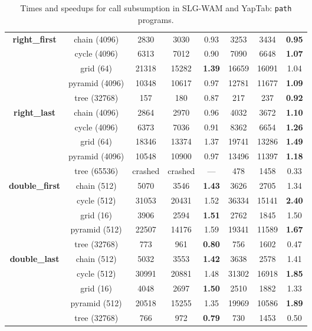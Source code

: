 \begin{table}[ht]
{\begin{tabular}{cc|ccc|ccc}
   \multirow{5}{*}{\textbf{right\_first}} &  \scriptsize{chain  (4096) }  &  2830 & 3030 &  0.93  & 3253 & 3434 &  \textbf{0.95} \\
   &  \scriptsize{cycle  (4096) }  &  6313 & 7012 &  0.90  & 7090 & 6648 &  \textbf{1.07} \\
   &  \scriptsize{grid  (64) }  &  21318 & 15282 &  \textbf{1.39}  & 16659 & 16091 &  1.04 \\
   &  \scriptsize{pyramid  (4096) }  &  10348 & 10617 &  0.97  & 12781 & 11677 &  \textbf{1.09} \\
   &  \scriptsize{tree  (32768) }  &  157 & 180 &  0.87  & 217 & 237 &  \textbf{0.92} \\
   \hline
   \multirow{5}{*}{\textbf{right\_last}} &  \scriptsize{chain  (4096) }  &  2864 & 2970 &  0.96  & 4032 & 3672 &  \textbf{1.10} \\
   &  \scriptsize{cycle  (4096) }  &  6373 & 7036 &  0.91  & 8362 & 6654 &  \textbf{1.26} \\
   &  \scriptsize{grid  (64) }  &  18346 & 13374 &  1.37  & 19741 & 13286 &  \textbf{1.49} \\
   &  \scriptsize{pyramid  (4096) }  &  10548 & 10900 &  0.97  & 13496 & 11397 &  \textbf{1.18} \\
   &  \scriptsize{tree  (65536) }  &  \scriptsize{crashed} & \scriptsize{crashed} &  ---  & 478 & 1458 &  0.33 \\
   \hline
   
   \multirow{5}{*}{\textbf{double\_first}} &  \scriptsize{chain  (512) }  &  5070 & 3546 &  \textbf{1.43}  & 3626 & 2705 &  1.34 \\
   &  \scriptsize{cycle  (512) }  &  31053 & 20431 &  1.52  & 36334 & 15141 &  \textbf{2.40} \\
   &  \scriptsize{grid  (16) }  &  3906 & 2594 &  \textbf{1.51}  & 2762 & 1845 &  1.50 \\
   &  \scriptsize{pyramid  (512) }  &  22507 & 14176 &  1.59  & 19341 & 11589 &  \textbf{1.67} \\
   &  \scriptsize{tree  (32768) }  &  773 & 961 &  \textbf{0.80}  & 756 & 1602 &  0.47 \\
   \hline
   \multirow{5}{*}{\textbf{double\_last}} &  \scriptsize{chain  (512) }  &  5032 & 3553 &  \textbf{1.42}  & 3638 & 2578 &  1.41 \\
   &  \scriptsize{cycle  (512) }  &  30991 & 20881 &  1.48  & 31302 & 16918 &  \textbf{1.85} \\
   &  \scriptsize{grid  (16) }  &  4048 & 2697 &  \textbf{1.50}  & 2510 & 1882 &  1.33 \\
   &  \scriptsize{pyramid  (512) }  &  20518 & 15255 &  1.35  & 19969 & 10586 &  \textbf{1.89} \\
   &  \scriptsize{tree  (32768) }  &  766 & 972 &  \textbf{0.79}  & 730 & 1453 &  0.50 \\
   \hline


\hline
\end{tabular}
}
\caption{Times and speedups for call subsumption in SLG-WAM and YapTab: \texttt{path} programs.}
\label{tbl:result_detail_path}
\end{table}
